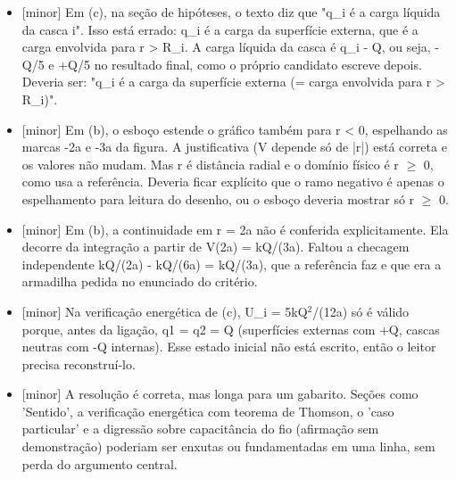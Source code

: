 \documentclass{article}%
\begin{document}
\begin{itemize}%
\item%
{[}minor{]} Em (c), na seção de hipóteses, o texto diz que "q\_i é a carga líquida da casca i". Isso está errado: q\_i é a carga da superfície externa, que é a carga envolvida para r > R\_i. A carga líquida da casca é q\_i - Q, ou seja, -Q/5 e +Q/5 no resultado final, como o próprio candidato escreve depois. Deveria ser: "q\_i é a carga da superfície externa (= carga envolvida para r > R\_i)".%
\item%
{[}minor{]} Em (b), o esboço estende o gráfico também para r < 0, espelhando as marcas -2a e -3a da figura. A justificativa (V depende só de |r|) está correta e os valores não mudam. Mas r é distância radial e o domínio físico é r $\geq$ 0, como usa a referência. Deveria ficar explícito que o ramo negativo é apenas o espelhamento para leitura do desenho, ou o esboço deveria mostrar só r $\geq$ 0.%
\item%
{[}minor{]} Em (b), a continuidade em r = 2a não é conferida explicitamente. Ela decorre da integração a partir de V(2a) = kQ/(3a). Faltou a checagem independente kQ/(2a) - kQ/(6a) = kQ/(3a), que a referência faz e que era a armadilha pedida no enunciado do critério.%
\item%
{[}minor{]} Na verificação energética de (c), U\_i = 5kQ$^2$/(12a) só é válido porque, antes da ligação, q1 = q2 = Q (superfícies externas com +Q, cascas neutras com -Q internas). Esse estado inicial não está escrito, então o leitor precisa reconstruí{-}lo.%
\item%
{[}minor{]} A resolução é correta, mas longa para um gabarito. Seções como 'Sentido', a verificação energética com teorema de Thomson, o 'caso particular' e a digressão sobre capacitância do fio (afirmação sem demonstração) poderiam ser enxutas ou fundamentadas em uma linha, sem perda do argumento central.%
\end{itemize}%
\end{document}
